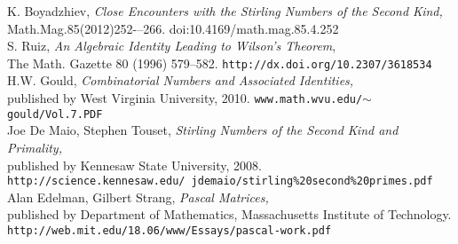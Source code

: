 \documentclass[]{amsart}
\begin{document}
\begin{thebibliography}{5}
	
	 K. Boyadzhiev, \textit{Close Encounters with the Stirling
	Numbers of the Second Kind,}\\ 
	Math.Mag.85(2012)252-–266. doi:10.4169/math.mag.85.4.252\\
	
	  S. Ruiz, \textit{An Algebraic Identity Leading to Wilson's Theorem},\\ 
	The Math. Gazette 80 (1996) 579–582.  \texttt{http://dx.doi.org/10.2307/3618534}\\
	
	 H.W. Gould, \textit{Combinatorial Numbers and Associated Identities,}\\
	published by West Virginia University, 2010.  \texttt{www.math.wvu.edu/$\sim$gould/Vol.7.PDF}\\
	
	 Joe De Maio, Stephen Touset, \textit{Stirling Numbers of the Second Kind and Primality,}\\
	published by Kennesaw State University, 2008.\\  \texttt{http://science.kennesaw.edu/~jdemaio/stirling\%20second\%20primes.pdf}\\
	
	 Alan Edelman, Gilbert Strang, \textit{Pascal Matrices,}\\
	published by Department of Mathematics, Massachusetts Institute of Technology.\\  \texttt{http://web.mit.edu/18.06/www/Essays/pascal-work.pdf}
	
\end{thebibliography}
\end{document}
